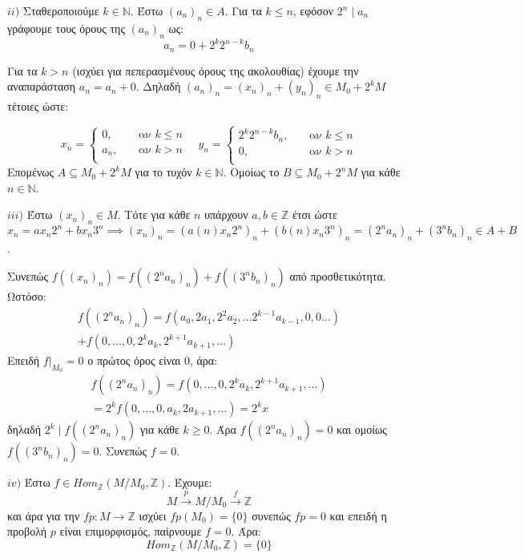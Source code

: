 \documentclass{article}
\begin{document}
\begin{enumerate}
	$ii)$ Σταθεροποιούμε $k \in \mathbb{N}$. Έστω $(a_n)_n \in A$. Για τα $k \leq n$, εφόσον $2^n \mid a_n$ γράφουμε τους όρους της $(a_n)_n$ ως:
	$$a_n = 0 +  2^k 2^{n-k} b_n$$

	Για τα $k > n$ (ισχύει για πεπερασμένους όρους της ακολουθίας) έχουμε την αναπαράσταση $a_n = a_n + 0$. Δηλαδή $(a_n)_n = (x_n)_n + (y_n)_n \in M_0 + 2^k M$ τέτοιες ώστε:

	\[
x_n =
     \begin{cases}
       0, &\quad\text{αν } k \leq n\\
       a_n,  &\quad\text{αν } k >n \\
     \end{cases} \quad
y_n = \begin{cases}
	2^k 2^{n-k} b_n, &\quad\text{αν } k \leq n\\
	0, &\quad\text{αν } k > n \\
\end{cases}
\]
Επομένως $A \subseteq M_0 + 2^k M$ για το τυχόν $k \in \mathbb{N}$. Ομοίως το $B \subseteq M_0 + 2^n M$ για κάθε $n \in \mathbb{N}$.
$ $\newline

$iii)$ Έστω $(x_n)_n \in M$. Τότε για κάθε $n$ υπάρχουν $a, b \in \mathbb{Z}$ έτσι ώστε $x_n = ax_n 2^n + b x_n 3^n \implies (x_n)_n = (a(n) x_n 2^n)_n + (b(n) x_n 3^n)_n = (2^n a_n)_n + (3^n b_n)_n \in A+B$.

Συνεπώς $f((x_n)_n) = f((2^n a_n)_n) + f((3^n b_n)_n)$ από προσθετικότητα. Ωστόσο: 
\begin{gather*}
	f((2^n a_n)_n) = f(a_0, 2a_1, 2^2 a_2,\ldots 2^{k-1} a_{k-1}, 0, 0 \ldots ) \\
	+ f(0,\ldots,0 ,2^k a_k, 2^{k+1} a_{k+1}, \ldots )
\end{gather*}
Επειδή $f|_{Μ_0} = 0$ ο πρώτος όρος είναι 0, άρα:
\begin{gather*}
	f((2^n a_n)_n) = f(0,\ldots,0 ,2^k a_k, 2^{k+1} a_{k+1}, \ldots ) \\
	= 2^k f( 0,\ldots, 0 , a_k, 2a_{k+1},\ldots ) = 2^k x
\end{gather*}
δηλαδή $2^k \mid f((2^n a_n)_n) $ για κάθε $k\geq 0$. Άρα $f((2^n a_n)_n) = 0$ και ομοίως $f((3^n b_n)_n) = 0$. Συνεπώς $f=0$.
$ $\newline

$iv)$ Έστω $f\in Hom_{\mathbb{Z}} (M / M_0 , \mathbb{Z} )$. Έχουμε:
$$M \xrightarrow{p} M / M_0 \xrightarrow{f} \mathbb{Z} $$
και άρα για την $fp : M \rightarrow \mathbb{Z}$ ισχύει $fp( M_0) = \{0 \} $ συνεπώς $fp = 0$ και επειδή η προβολή $p$ είναι επιμορφισμός, παίρνουμε $f=0$. Άρα:
$$Hom_{\mathbb{Z}} (M / M_0 , \mathbb{Z} ) = \{ 0 \}$$
$ $\newline


\end{enumerate}
\end{document}

